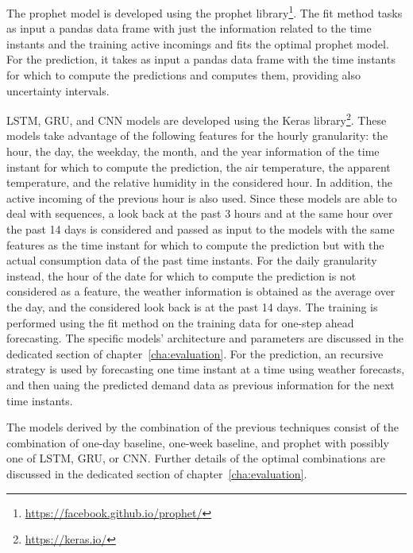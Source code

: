 The prophet model is developed using the prophet library\footnote{ \url{https://facebook.github.io/prophet/} }.
The fit method tasks as input a pandas data frame with just the information related to the time instants and the training active incomings and fits the optimal prophet model.
For the prediction, it takes as input a pandas data frame with the time instants for which to compute the predictions and computes them, providing also uncertainty intervals.

LSTM, GRU, and CNN models are developed using the Keras library\footnote{ \url{https://keras.io/} }.
These models take advantage of the following features for the hourly granularity: the hour, the day, the weekday, the month, and the year information of the time instant for which to compute the prediction, the air temperature, the apparent temperature, and the relative humidity in the considered hour.
In addition, the active incoming of the previous hour is also used.
Since these models are able to deal with sequences, a look back at the past 3 hours and at the same hour over the past 14 days is considered and passed as input to the models with the same features as the time instant for which to compute the prediction but with the actual consumption data of the past time instants.
For the daily granularity instead, the hour of the date for which to compute the prediction is not considered as a feature, the weather information is obtained as the average over the day, and the considered look back is at the past 14 days.
The training is performed using the fit method on the training data for one-step ahead forecasting.
The specific models' architecture and parameters are discussed in the dedicated section of chapter~\ref{cha:evaluation}.
For the prediction, an recursive strategy is used by forecasting one time instant at a time using weather forecasts, and then uaing the predicted demand data as previous information for the next time instants.

The models derived by the combination of the previous techniques consist of the combination of one-day baseline, one-week baseline, and prophet with possibly one of LSTM, GRU, or CNN.
Further details of the optimal combinations are discussed in the dedicated section of chapter~\ref{cha:evaluation}.

